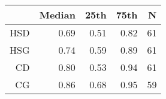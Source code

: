 \begin{tabular}{rrrrr}
\hline
 & Median & 25th & 75th & N \\ 
\hline
HSD & 0.69 & 0.51 & 0.82 & 61 \\ 
HSG & 0.74 & 0.59 & 0.89 & 61 \\ 
CD & 0.80 & 0.53 & 0.94 & 61 \\ 
CG & 0.86 & 0.68 & 0.95 & 59 \\ 
\hline
\end{tabular}%
